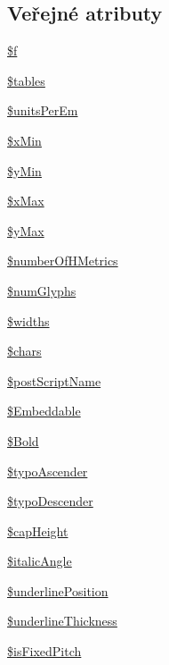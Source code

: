 \subsection*{Veřejné atributy}
\begin{DoxyCompactItemize}
\item 
\hyperlink{class_t_t_f_parser_aaa0e1e5670f133ad18e748244bf3b839}{\$f}
\item 
\hyperlink{class_t_t_f_parser_a6fec21b0a0305f020012e2382f96005f}{\$tables}
\item 
\hyperlink{class_t_t_f_parser_a081eb1e34c96b94b279365e285d77ee3}{\$units\-Per\-Em}
\item 
\hyperlink{class_t_t_f_parser_a0147f1450e3d775c89c1d50f531f1f54}{\$x\-Min}
\item 
\hyperlink{class_t_t_f_parser_a4562aa6fe0656069fcaad452bce2772f}{\$y\-Min}
\item 
\hyperlink{class_t_t_f_parser_a8dc1fa6634fad386dd721bda495dec93}{\$x\-Max}
\item 
\hyperlink{class_t_t_f_parser_ae3871bb9e3c31cb81fe616f4a59dbf19}{\$y\-Max}
\item 
\hyperlink{class_t_t_f_parser_a279359ab6abedfa1809311857245138f}{\$number\-Of\-H\-Metrics}
\item 
\hyperlink{class_t_t_f_parser_a6e663eabf186f7a15d60fdbd57974693}{\$num\-Glyphs}
\item 
\hyperlink{class_t_t_f_parser_a2ee6956fd3f8df4ba30e222658e0bed3}{\$widths}
\item 
\hyperlink{class_t_t_f_parser_ae450e6c969d5be14cc82a40c48697470}{\$chars}
\item 
\hyperlink{class_t_t_f_parser_ac67943b8655cae5c6ba81e7217abc04f}{\$post\-Script\-Name}
\item 
\hyperlink{class_t_t_f_parser_a511b00b1e6ca4011fe26e6d77ff542ea}{\$\-Embeddable}
\item 
\hyperlink{class_t_t_f_parser_a06cdff8e5c477c1953b59f9136ebe18f}{\$\-Bold}
\item 
\hyperlink{class_t_t_f_parser_a2e6d7caa84b7c678d3c475f71ec81528}{\$typo\-Ascender}
\item 
\hyperlink{class_t_t_f_parser_a7f2b6f4e0e71e6284255c46beb24586d}{\$typo\-Descender}
\item 
\hyperlink{class_t_t_f_parser_af01d90cd33a90e906db3bcbd63d78a54}{\$cap\-Height}
\item 
\hyperlink{class_t_t_f_parser_a00bf745d03b39f24fb36f94f14083d62}{\$italic\-Angle}
\item 
\hyperlink{class_t_t_f_parser_aa5db12337eeb53a2a0e33071dbe69e98}{\$underline\-Position}
\item 
\hyperlink{class_t_t_f_parser_a676721af52dd3748c9e0fdbd3056883d}{\$underline\-Thickness}
\item 
\hyperlink{class_t_t_f_parser_a939aa940d419002839e55f20ffd34b0a}{\$is\-Fixed\-Pitch}
\end{DoxyCompactItemize}



